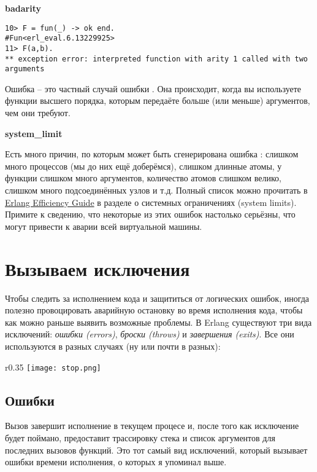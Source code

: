 \textbf{badarity}
\begin{lstlisting}[style=erlang]
10> F = fun(_) -> ok end.
#Fun<erl_eval.6.13229925>
11> F(a,b).
** exception error: interpreted function with arity 1 called with two arguments
\end{lstlisting}
Ошибка  \--- это частный случай ошибки . 
Она происходит, когда вы используете функции высшего порядка, которым передаёте больше (или меньше) аргументов, чем они требуют.
\blankline

\textbf{system\_limit}

Есть много причин, по которым может быть сгенерирована ошибка : слишком много процессов (мы до них ещё доберёмся), слишком длинные атомы, у функции слишком много аргументов, количество атомов слишком велико, слишком много подсоединённых узлов и т.д.
Полный список можно прочитать в \href{http://www.erlang.org/doc/efficiency_guide/advanced.html#id2265856}{Erlang Efficiency Guide} в разделе о системных ограничениях (system limits).
Примите к сведению, что некоторые из этих ошибок настолько серьёзны, что могут привести к аварии всей виртуальной машины.

\section{Вызываем исключения}
\label{raising-exceptions}
Чтобы следить за исполнением кода и защититься от логических ошибок, иногда полезно провоцировать аварийную остановку во время исполнения кода, чтобы как можно раньше выявить возможные проблемы.
В Erlang существуют три вида исключений: \emph{ошибки (errors)}, \emph{броски (throws)} и \emph{завершения (exits)}. Все они используются в разных случаях (ну или почти в разных):

\begin{wrapfigure}{r}{0.35\linewidth}
    \texttt{[image: stop.png]}
\end{wrapfigure}

\subsection{Ошибки}
\label{errors}
Вызов  завершит исполнение в текущем процесе и, после того как исключение будет поймано, предоставит трассировку стека и список аргументов для последних вызовов функций.
Это тот самый вид исключений, который вызывает ошибки времени исполнения, о которых я упоминал выше.

